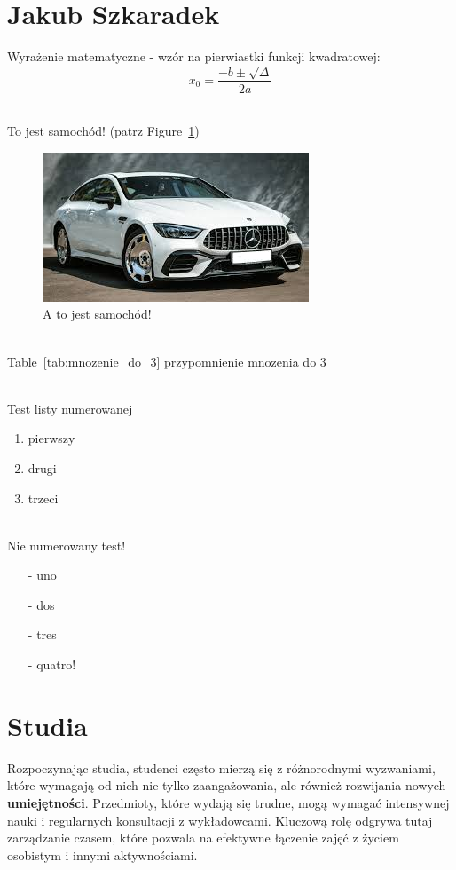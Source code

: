 \section{Jakub Szkaradek}


Wyrażenie matematyczne - wzór na pierwiastki funkcji kwadratowej:
\[ x_{0} = \frac{-b \pm \sqrt{\Delta}}{2a} \]


\noindent %
\\To jest samochód! (patrz Figure~\ref{fig:samochod})

\begin{figure}[htbp]
    \centering %
    \includegraphics[width=0.5\linewidth]{pictures/samochód.jpg}
    \caption{A to jest samochód!}
    \label{fig:samochod}
\end{figure}


\noindent
\\Table~\ref{tab:mnozenie_do_3} przypomnienie mnozenia do 3




\noindent
\\Test listy numerowanej
\begin{enumerate}
    \item pierwszy
    \item drugi
    \item trzeci
\end{enumerate}


\noindent
\\ Nie numerowany test!
\begin{itemize}
    \item[-] uno
    \item[-] dos
    \item[-] tres
    \item[-] quatro!
\end{itemize}


\setlength{\parindent}{18pt}

\section*{Studia}
Rozpoczynając studia, studenci często mierzą się z różnorodnymi wyzwaniami, które wymagają od nich nie tylko zaangażowania, ale również rozwijania nowych \textbf{umiejętności}. Przedmioty, które wydają się trudne, mogą wymagać intensywnej nauki i regularnych konsultacji z wykładowcami. Kluczową rolę odgrywa tutaj zarządzanie czasem, które pozwala na efektywne łączenie zajęć z życiem osobistym i innymi aktywnościami.

